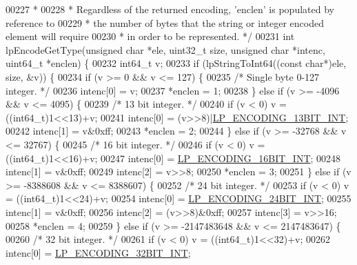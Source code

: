 \begin{DoxyCode}
00227 \textcolor{comment}{ *}
00228 \textcolor{comment}{ * Regardless of the returned encoding, 'enclen' is populated by reference to}
00229 \textcolor{comment}{ * the number of bytes that the string or integer encoded element will require}
00230 \textcolor{comment}{ * in order to be represented. */}
00231 \textcolor{keywordtype}{int} lpEncodeGetType(\textcolor{keywordtype}{unsigned} \textcolor{keywordtype}{char} *ele, uint32\_t size, \textcolor{keywordtype}{unsigned} \textcolor{keywordtype}{char} *intenc, uint64\_t *enclen) \{
00232     int64\_t v;
00233     \textcolor{keywordflow}{if} (lpStringToInt64((\textcolor{keyword}{const} \textcolor{keywordtype}{char}*)ele, size, &v)) \{
00234         \textcolor{keywordflow}{if} (v >= 0 && v <= 127) \{
00235             \textcolor{comment}{/* Single byte 0-127 integer. */}
00236             intenc[0] = v;
00237             *enclen = 1;
00238         \} \textcolor{keywordflow}{else} \textcolor{keywordflow}{if} (v >= -4096 && v <= 4095) \{
00239             \textcolor{comment}{/* 13 bit integer. */}
00240             \textcolor{keywordflow}{if} (v < 0) v = ((int64\_t)1<<13)+v;
00241             intenc[0] = (v>>8)|\hyperlink{listpack_8c_a9cfea84c38c5cf0d152f0e40fdd7c1fc}{LP\_ENCODING\_13BIT\_INT};
00242             intenc[1] = v&0xff;
00243             *enclen = 2;
00244         \} \textcolor{keywordflow}{else} \textcolor{keywordflow}{if} (v >= -32768 && v <= 32767) \{
00245             \textcolor{comment}{/* 16 bit integer. */}
00246             \textcolor{keywordflow}{if} (v < 0) v = ((int64\_t)1<<16)+v;
00247             intenc[0] = \hyperlink{listpack_8c_a4e888717b76a31a4ea334a03fea25047}{LP\_ENCODING\_16BIT\_INT};
00248             intenc[1] = v&0xff;
00249             intenc[2] = v>>8;
00250             *enclen = 3;
00251         \} \textcolor{keywordflow}{else} \textcolor{keywordflow}{if} (v >= -8388608 && v <= 8388607) \{
00252             \textcolor{comment}{/* 24 bit integer. */}
00253             \textcolor{keywordflow}{if} (v < 0) v = ((int64\_t)1<<24)+v;
00254             intenc[0] = \hyperlink{listpack_8c_a431020d4a3ee70b22b181b52fd231a77}{LP\_ENCODING\_24BIT\_INT};
00255             intenc[1] = v&0xff;
00256             intenc[2] = (v>>8)&0xff;
00257             intenc[3] = v>>16;
00258             *enclen = 4;
00259         \} \textcolor{keywordflow}{else} \textcolor{keywordflow}{if} (v >= -2147483648 && v <= 2147483647) \{
00260             \textcolor{comment}{/* 32 bit integer. */}
00261             \textcolor{keywordflow}{if} (v < 0) v = ((int64\_t)1<<32)+v;
00262             intenc[0] = \hyperlink{listpack_8c_aaf5d2cb51cf79d9609347c1cf7985711}{LP\_ENCODING\_32BIT\_INT};

\end{DoxyCode}
